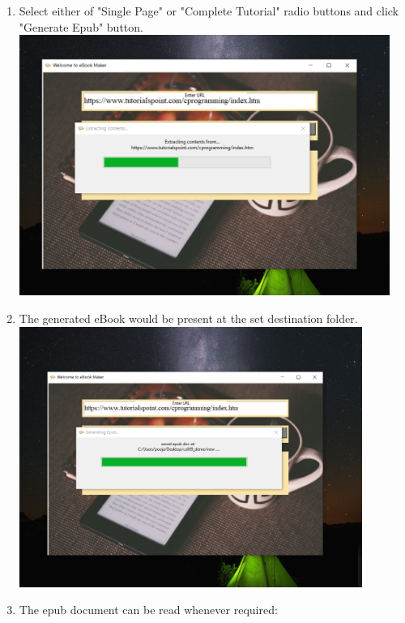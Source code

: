 \documentclass[12pt,a4paper,titlepage]{article}
\begin{document}
\begin{enumerate}
\newline 
\newpage
\item Select either of "Single Page" or "Complete Tutorial" radio buttons and click "Generate Epub" button.
\newline \\\includegraphics[width=\textwidth,height=8.5cm]{3.png}
\newline 
\item The generated eBook would be present at the set destination folder.
\newline \\\includegraphics[width=\textwidth,height=8.5cm]{4.png}
\newline 
\newpage
\item The epub document can be read whenever required:

\end{enumerate}
\end{document}
